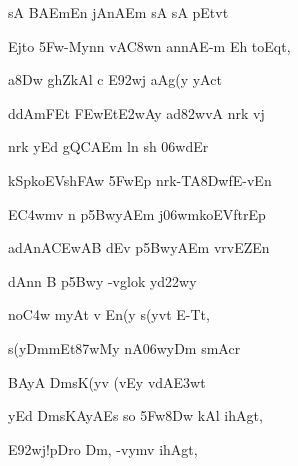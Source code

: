 {\dn sA BAEmEn jAnAEm sA sA pEtv\5t\?{\dandadn} \dontdisplaylinenum}

{\dn Ejto \35Fw-Myn\?n vA\3C8w\?n an\?nAE-m Eh toEqt, \vegdn\dontdisplaylinenum}

{\dn a\38Dw g\5hZkAl\? c E\392wj aAg(y yAct\?{\dandabdn} \dontdisplaylinenum}

{\dn ddAmFEt \3FEwEt\3E2wAy ad\382wvA nrk\2 v\5j\? \vegdn\dontdisplaylinenum}

{\dn nrk\2 yEd gQCAEm l\?n sh \306wdEr{\dandabdn} \dontdisplaylinenum}

{\dn kSpkoEVsh\3FAw\? \35FwEp nrk-TA\38DwfE-vEn \vegdn\dontdisplaylinenum}

{\dn {}E\3C4wm\?v n p\35BwyAEm j\306wmkoEVft\4rEp{\dandabdn} \dontdisplaylinenum}

{\dn adAnA\3CEwAB\2 d\?Ev p\35BwyAEm vrvEZ\0En \vegdn\dontdisplaylinenum}

{\dn dAn\?n  B\2 p\35Bwy\? -vg\0lok\? yd\322wy \dontdisplaylinenum}

{\dn no\3C4w\2 myAt\2 v{\rdt} En(y\2 s(yv\5t\? E-Tt, \vegdn\dontdisplaylinenum}

{\dn s(yDm\0mEt\387wMy nA\306wyDm{\rdt} smAcr\?{\dandabdn} \dontdisplaylinenum}

{\dn BAyA\0 Dm\0sK\?(y\?v\2 (vEy v\0dA\3E3wt \vegdn\dontdisplaylinenum}

{\dn yEd Dm\0sKAyAEs so \35Fw\38Dw kAl ihAgt,{\dandabdn} \dontdisplaylinenum}

{\dn E\392wj!pDro Dm\0, -vym\?v ihAgt, \vegdn\dontdisplaylinenum}

